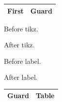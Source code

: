 \documentclass{article}
\begin{document}
\begin{tabular}{|l|l|}
\hline
First & Guard\\
\hline
\end{tabular}

Before tikz.
After tikz.

Before label.
\def\svgwidth{100pt}

After label.

\begin{tabular}{|l|l|}
\hline
Guard & Table\\
\hline
\end{tabular}
\end{document}
